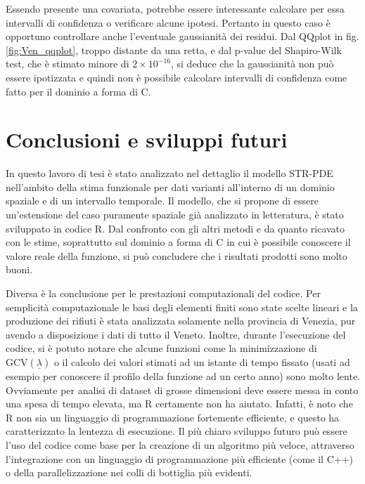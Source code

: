 \documentclass[a4paper,11pt,twoside,openright]{book}							%
\begin{document}
Essendo presente una covariata, potrebbe essere interessante calcolare per essa intervalli di confidenza o verificare alcune ipotesi. Pertanto in questo caso è opportuno controllare anche l'eventuale gaussianità dei residui. Dal QQplot in fig. \ref{fig:Ven_qqplot}, troppo distante da una retta, e dal p-value del Shapiro-Wilk test, che è stimato minore di $2\times 10^{-16}$, si deduce che la gaussianità non può essere ipotizzata e quindi non è possibile calcolare intervalli di confidenza come fatto per il dominio a forma di C.





\chapter{Conclusioni e sviluppi futuri}
\label{cap:conclusione}

In questo lavoro di tesi è stato analizzato nel dettaglio il modello STR-PDE nell'ambito della stima funzionale per dati varianti all'interno di un dominio spaziale e di un intervallo temporale. Il modello, che si propone di essere un'estensione del caso puramente spaziale già analizzato in letteratura, è stato sviluppato in codice R. Dal confronto con gli altri metodi e da quanto ricavato con le stime, soprattutto sul dominio a forma di C in cui è possibile conoscere il valore reale della funzione, si può concludere che i risultati prodotti sono molto buoni.

Diversa è la conclusione per le prestazioni computazionali del codice. Per semplicità computazionale le basi degli elementi finiti sono state scelte lineari e la produzione dei rifiuti è stata analizzata solamente nella provincia di Venezia, pur avendo a disposizione i dati di tutto il Veneto. Inoltre, durante l'esecuzione del codice, si è potuto notare che alcune funzioni come la minimizzazione di $\mathrm{GCV}(\underline \lambda)$ o il calcolo dei valori stimati ad un istante di tempo fissato (usati ad esempio per conoscere il profilo della funzione ad un certo anno) sono molto lente. Ovviamente per analisi di dataset di grosse dimensioni deve essere messa in conto una spesa di tempo elevata, ma R certamente non ha aiutato. Infatti, è noto che R non sia un linguaggio di programmazione fortemente efficiente, e questo ha caratterizzato la lentezza di esecuzione. Il più chiaro sviluppo futuro può essere l'uso del codice come base per la creazione di un algoritmo più veloce, attraverso l'integrazione con un linguaggio di programmazione più efficiente (come il C++) o della parallelizzazione nei colli di bottiglia più evidenti.
\end{document}
